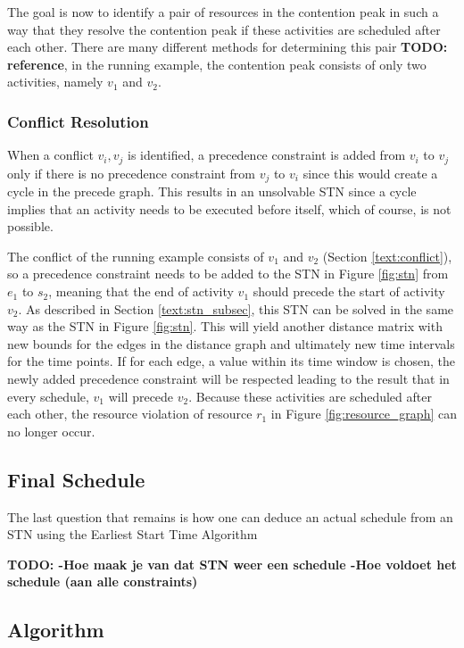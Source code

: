 \documentclass{article}
\theoremstyle{definition}
\newcommand{\TODO}[1]{{\color{red}\textbf{TODO: #1}}}
\begin{document}
The goal is now to identify a pair of resources in the contention peak in such a way that they resolve the contention peak if these activities are scheduled after each other. There are many different methods for determining this pair \TODO{reference}, in the running example, the contention peak consists of only two activities, namely $v_1$ and $v_2$.

\subsubsection{Conflict Resolution}
When a conflict ${v_i, v_j}$ is identified, a precedence constraint is added from $v_i$ to $v_j$ only if there is no precedence constraint from $v_j$ to $v_i$ since this would create a cycle in the precede graph. This results in an unsolvable STN since a cycle implies that an activity needs to be executed before itself, which of course, is not possible.

The conflict of the running example consists of $v_1$ and $v_2$ (Section \ref{text:conflict}), so a precedence constraint needs to be added to the STN in Figure \ref{fig:stn} from $e_1$ to $s_2$, meaning that the end of activity $v_1$ should precede the start of activity $v_2$. As described in Section \ref{text:stn_subsec}, this STN can be solved in the same way as the STN in Figure \ref{fig:stn}. This will yield another distance matrix with new bounds for the edges in the distance graph and ultimately new time intervals for the time points. If for each edge, a value within its time window is chosen, the newly added precedence constraint will be respected leading to the result that in every schedule, $v_1$ will precede $v_2$. Because these activities are scheduled after each other, the resource violation of resource $r_1$ in Figure \ref{fig:resource_graph} can no longer occur.

\subsection{Final Schedule}
The last question that remains is how one can deduce an actual schedule from an STN using the Earliest Start Time Algorithm


\TODO{
		-Hoe maak je van dat STN weer een schedule
		-Hoe voldoet het schedule (aan alle constraints)
}

\subsection{Algorithm}
\end{document}
